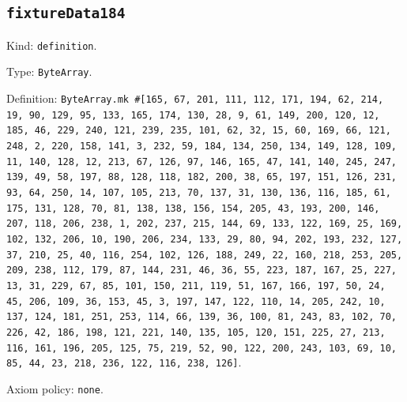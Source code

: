 \documentclass[11pt]{article}
\begin{document}
\subsection*{\texttt{fixtureData184}}
\noindent Kind: \texttt{definition}.\par
\noindent Type: \texttt{ByteArray}.\par
\noindent Definition: \texttt{ByteArray.mk \#[165, 67, 201, 111, 112, 171, 194, 62, 214, 19, 90, 129, 95, 133, 165, 174, 130, 28, 9, 61, 149, 200, 120, 12, 185, 46, 229, 240, 121, 239, 235, 101, 62, 32, 15, 60, 169, 66, 121, 248, 2, 220, 158, 141, 3, 232, 59, 184, 134, 250, 134, 149, 128, 109, 11, 140, 128, 12, 213, 67, 126, 97, 146, 165, 47, 141, 140, 245, 247, 139, 49, 58, 197, 88, 128, 118, 182, 200, 38, 65, 197, 151, 126, 231, 93, 64, 250, 14, 107, 105, 213, 70, 137, 31, 130, 136, 116, 185, 61, 175, 131, 128, 70, 81, 138, 138, 156, 154, 205, 43, 193, 200, 146, 207, 118, 206, 238, 1, 202, 237, 215, 144, 69, 133, 122, 169, 25, 169, 102, 132, 206, 10, 190, 206, 234, 133, 29, 80, 94, 202, 193, 232, 127, 37, 210, 25, 40, 116, 254, 102, 126, 188, 249, 22, 160, 218, 253, 205, 209, 238, 112, 179, 87, 144, 231, 46, 36, 55, 223, 187, 167, 25, 227, 13, 31, 229, 67, 85, 101, 150, 211, 119, 51, 167, 166, 197, 50, 24, 45, 206, 109, 36, 153, 45, 3, 197, 147, 122, 110, 14, 205, 242, 10, 137, 124, 181, 251, 253, 114, 66, 139, 36, 100, 81, 243, 83, 102, 70, 226, 42, 186, 198, 121, 221, 140, 135, 105, 120, 151, 225, 27, 213, 116, 161, 196, 205, 125, 75, 219, 52, 90, 122, 200, 243, 103, 69, 10, 85, 44, 23, 218, 236, 122, 116, 238, 126]}.\par
\noindent Axiom policy: \texttt{none}.\par
\end{document}
